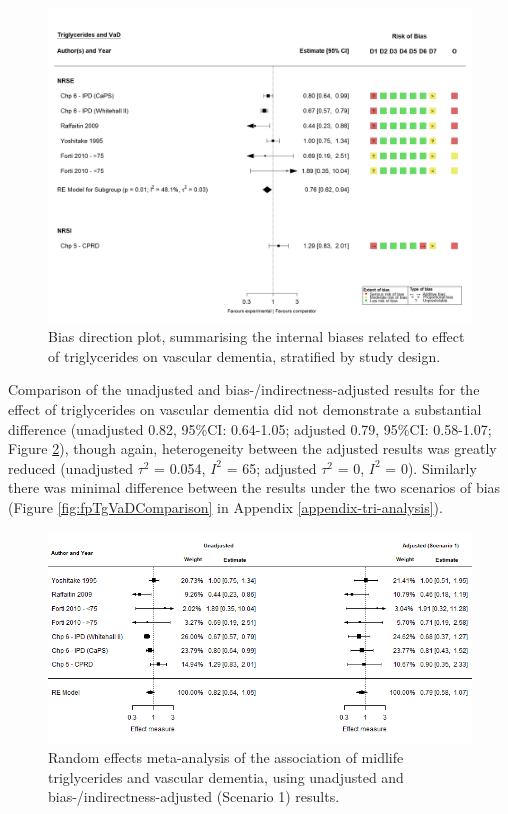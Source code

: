 \documentclass[a4paper, twoside]{templates/ociamthesis}
\begin{document}
\begin{figure}[H]
\includegraphics[width=1\linewidth]{figures/tri/midlife_VaD} \caption[Bias direction plot for triglycerides/vascular dementia]{Bias direction plot, summarising the internal biases related to effect of triglycerides on vascular dementia, stratified by study design.}\label{fig:tgVadBiasDirection}
\end{figure}

Comparison of the unadjusted and bias-/indirectness-adjusted results for the effect of triglycerides on vascular dementia did not demonstrate a substantial difference (unadjusted 0.82, 95\%CI: 0.64-1.05; adjusted 0.79, 95\%CI: 0.58-1.07; Figure \ref{fig:fpTgVad}), though again, heterogeneity between the adjusted results was greatly reduced (unadjusted \(\tau^2\) = 0.054, \(I^2\) = 65; adjusted \(\tau^2\) = 0, \(I^2\) = 0). Similarly there was minimal difference between the results under the two scenarios of bias (Figure \ref{fig:fpTgVaDComparison} in Appendix \ref{appendix-tri-analysis}).





\begin{figure}[H]
\includegraphics[width=1\linewidth]{figures/tri/fp_paired_midlife_tg_vad} \caption[shortcap]{Random effects meta-analysis of the association of midlife triglycerides and vascular dementia, using unadjusted and bias-/indirectness-adjusted (Scenario 1) results.}\label{fig:fpTgVad}
\end{figure}
\end{document}

